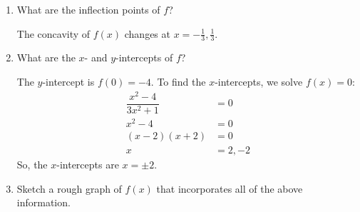\documentclass{article}
\renewcommand{\answer}[1]{#1}
\theoremstyle{theorem}
\begin{document}
\begin{enumerate}
\begin{enumerate}[resume]
    \begin{solution}
      The only place where $f$ switches from increasing to decreasing or vice versa is $x = \boxed{0}$. 
    \end{solution}

  \item

    \begin{problem}[0.25in]
      What are the inflection points of $f$?  
    \end{problem}

    \begin{solution}
      The concavity of $f(x)$ changes at $x = \boxed{ - \frac{1}{3}, \frac{1}{3}}$. 
    \end{solution}

    \pspace{\newpage}

  \item
    \begin{problem}[1in]
      What are the $x$- and $y$-intercepts of $f$?
    \end{problem}

    \begin{solution}
      The \answer{$y$-intercept is $f(0) = -4$}. To find the $x$-intercepts, we solve $f(x) = 0$:
      \begin{align*}
        \dfrac{x^2 - 4}{3x^2 + 1} &= 0 \\
        x^2 - 4 &= 0 \\
        (x - 2)(x + 2) &= 0 \\
        x &= 2, -2
      \end{align*}
      So, the \answer{$x$-intercepts are $x = \pm 2$}. 
    \end{solution}

  \item
    \begin{problem}[\newpage]
      Sketch a rough graph of $f(x)$ that incorporates all of the above
      information.
    \end{problem}


\end{enumerate}
\end{enumerate}
\end{document}
